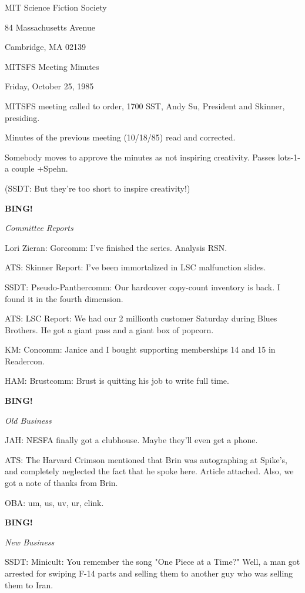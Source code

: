 \documentclass[12pt]{article}
\newcommand{\bing}{{\bf BING!} }
\newcommand{\goto}[1]{\bing \vskip 12pt \centerline{{\em{#1}}}}
\begin{document}
\begin{center}

MIT Science Fiction Society 

84 Massachusetts Avenue

Cambridge, MA 02139

\vspace{12pt}

MITSFS Meeting Minutes 

Friday, October 25, 1985

\end{center}
 
\vspace{18pt}

\setlength{\parskip}{6pt}

\noindent
MITSFS meeting called to order, 1700 SST,
Andy Su, President and Skinner, presiding.

Minutes of the previous meeting (10/18/85) read and corrected.

Somebody moves to approve the minutes as not inspiring creativity. Passes lots-1-a couple +Spehn.

(SSDT: But they're too short to inspire creativity!)

\goto{Committee Reports}

Lori Zieran: Gorcomm: I've finished the series. Analysis RSN.

ATS: Skinner Report: I've been immortalized in LSC malfunction slides.

SSDT: Pseudo-Panthercomm: Our hardcover copy-count inventory is back. I found it in the fourth dimension.

ATS: LSC Report: We had our 2 millionth customer Saturday during Blues Brothers. He got a giant pass and a giant box of popcorn.

KM: Concomm: Janice and I bought supporting memberships 14 and 15 in Readercon.

HAM: Brustcomm: Brust is quitting his job to write full time.

\goto{Old Business}

JAH: NESFA finally got a clubhouse. Maybe they'll even get a phone.

ATS: The Harvard Crimson mentioned that Brin was autographing at Spike's, and completely neglected the fact that he spoke here. Article attached. Also, we got a note of thanks from Brin.

OBA: um, us, uv, ur, clink.

\goto{New Business}

SSDT: Minicult: You remember the song "One Piece at a Time?" Well, a man got arrested for swiping F-14 parts and selling them to another guy who was selling them to Iran.
\end{document}
